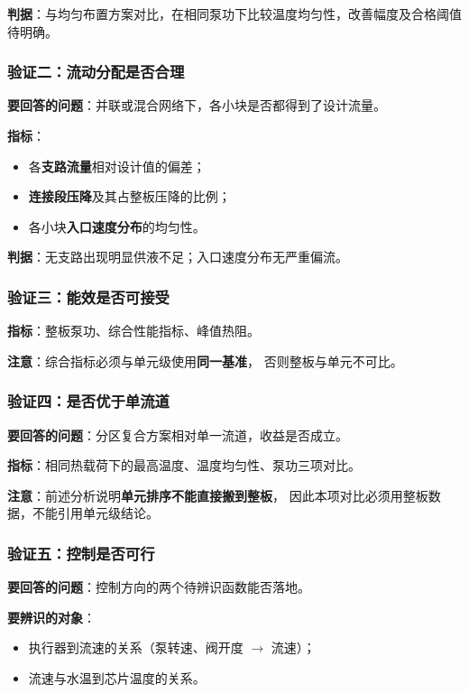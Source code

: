 \documentclass[stage2,fontset=fandol]{ydzjreport}
\begin{document}
\textbf{判据}：与均匀布置方案对比，在相同泵功下比较温度均匀性，改善幅度及合格阈值待明确。

\subsubsection{验证二：流动分配是否合理}

\textbf{要回答的问题}：并联或混合网络下，各小块是否都得到了设计流量。

\textbf{指标}：
\begin{itemize}
  \item 各\textbf{支路流量}相对设计值的偏差；
  \item \textbf{连接段压降}及其占整板压降的比例；
  \item 各小块\textbf{入口速度分布}的均匀性。
\end{itemize}

\textbf{判据}：无支路出现明显供液不足；入口速度分布无严重偏流。

\subsubsection{验证三：能效是否可接受}

\textbf{指标}：整板泵功、综合性能指标、峰值热阻。

\textbf{注意}：综合指标必须与单元级使用\textbf{同一基准}，
否则整板与单元不可比。

\subsubsection{验证四：是否优于单流道}

\textbf{要回答的问题}：分区复合方案相对单一流道，收益是否成立。

\textbf{指标}：相同热载荷下的最高温度、温度均匀性、泵功三项对比。

\textbf{注意}：前述分析说明\textbf{单元排序不能直接搬到整板}，
因此本项对比必须用整板数据，不能引用单元级结论。

\subsubsection{验证五：控制是否可行}

\textbf{要回答的问题}：控制方向的两个待辨识函数能否落地。

\textbf{要辨识的对象}：
\begin{itemize}
  \item 执行器到流速的关系（泵转速、阀开度 $\rightarrow$ 流速）；
  \item 流速与水温到芯片温度的关系。
\end{itemize}
\end{document}
